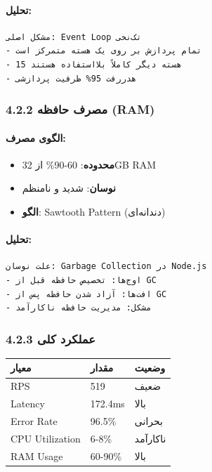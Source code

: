 \documentclass[
]{article}
\newcounter{none} %
\providecommand{\tightlist}{%
  \setlength{\itemsep}{0pt}\setlength{\parskip}{0pt}}
\begin{document}
\paragraph{تحلیل:}\label{ux62aux62dux644ux6ccux644}

\begin{verbatim}
مشکل اصلی: Event Loop تک‌نخی
- تمام پردازش بر روی یک هسته متمرکز است
- 15 هسته دیگر کاملاً بلااستفاده هستند
- هدررفت 95% ظرفیت پردازشی
\end{verbatim}

\subsubsection{4.2.2 مصرف حافظه
(RAM)}\label{ux645ux635ux631ux641-ux62dux627ux641ux638ux647-ram}

\paragraph{الگوی
مصرف:}\label{ux627ux644ux6afux648ux6cc-ux645ux635ux631ux641}

\begin{itemize}
\tightlist
\item
  \textbf{محدوده}: 60-90\% از 32GB RAM
\item
  \textbf{نوسان}: شدید و نامنظم
\item
  \textbf{الگو}: Sawtooth Pattern (دندانه‌ای)
\end{itemize}

\paragraph{تحلیل:}\label{ux62aux62dux644ux6ccux644-1}

\begin{verbatim}
علت نوسان: Garbage Collection در Node.js
- اوج‌ها: تخصیص حافظه قبل از GC
- افت‌ها: آزاد شدن حافظه پس از GC
- مشکل: مدیریت حافظه ناکارآمد
\end{verbatim}

\subsubsection{4.2.3 عملکرد
کلی}\label{ux639ux645ux644ux6a9ux631ux62f-ux6a9ux644ux6cc}

{\def\LTcaptype{none} %
\begin{longtable}[]{@{}lll@{}}
\toprule\noalign{}
معیار & مقدار & وضعیت \\
\midrule\noalign{}
\endhead
\bottomrule\noalign{}
\endlastfoot
RPS & 519 & ضعیف \\
Latency & 172.4ms & بالا \\
Error Rate & 96.5\% & بحرانی \\
CPU Utilization & 6-8\% & ناکارآمد \\
RAM Usage & 60-90\% & بالا \\
\end{longtable}
}
\end{document}
